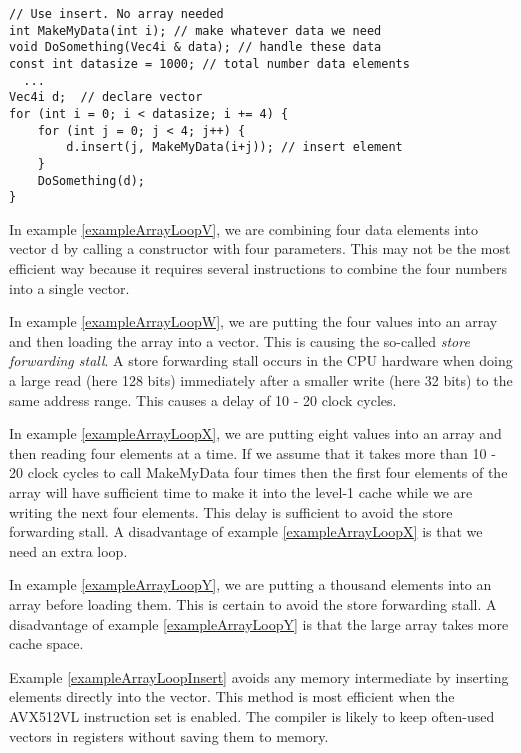 \documentclass[vcl_manual.tex]{subfiles}
\begin{document}
\begin{example}
\label{exampleArrayLoopInsert}
\end{example}
\begin{lstlisting}[frame=single]
// Use insert. No array needed
int MakeMyData(int i); // make whatever data we need
void DoSomething(Vec4i & data); // handle these data
const int datasize = 1000; // total number data elements
  ...
Vec4i d;  // declare vector
for (int i = 0; i < datasize; i += 4) {
    for (int j = 0; j < 4; j++) {
        d.insert(j, MakeMyData(i+j)); // insert element
    }
    DoSomething(d);
}
\end{lstlisting}

In example \ref{exampleArrayLoopV}, we are combining four data elements into vector d by calling a constructor with four parameters. This may not be the most efficient way because it requires several instructions to combine the four numbers into a single vector.

In example \ref{exampleArrayLoopW}, we are putting the four values into an array and then loading the array into a vector. This is causing the so-called \emph{store forwarding stall}. A store forwarding stall occurs in the CPU hardware when doing a large read (here 128 bits) immediately after a smaller write (here 32 bits) to the same address range. This causes a delay of 10 - 20 clock cycles.

In example \ref{exampleArrayLoopX}, we are putting eight values into an array and then reading four elements at a time. If we assume that it takes more than 10 - 20 clock cycles to call MakeMyData four times then the first four elements of the array will have sufficient time to make it into the level-1 cache while we are writing the next four elements. This delay is sufficient to avoid the store forwarding stall. A disadvantage of example \ref{exampleArrayLoopX} is that we need an extra loop.

In example \ref{exampleArrayLoopY}, we are putting a thousand elements into an array before loading them. This is certain to avoid the store forwarding stall. A disadvantage of example \ref{exampleArrayLoopY} is that the large array takes more cache space.

Example \ref{exampleArrayLoopInsert} avoids any memory intermediate by inserting elements directly into the vector. This method is most efficient when the AVX512VL instruction set is enabled. The compiler is likely to keep often-used vectors in registers without saving them to memory.
\end{document}
